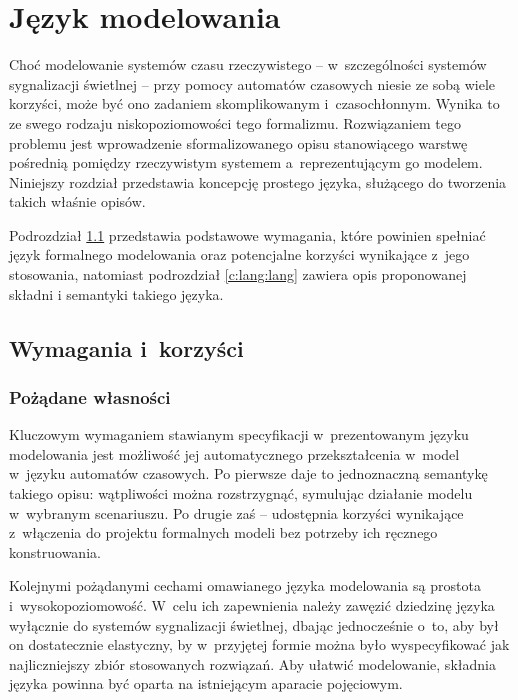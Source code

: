 \documentclass{pracamgr}
\newcommand{\upp}{\textsc{Uppaal}}
\theoremstyle{plain}
\begin{document}

\chapter{Język modelowania}
\label{c:lang}
Choć modelowanie systemów czasu rzeczywistego -- w~szczególności
systemów sygnalizacji świetlnej -- przy pomocy automatów czasowych
niesie ze sobą wiele korzyści, może być ono zadaniem skomplikowanym
i~czasochłonnym. Wynika to ze swego rodzaju niskopoziomowości tego
formalizmu. Rozwiązaniem tego problemu jest wprowadzenie
sformalizowanego opisu stanowiącego warstwę pośrednią pomiędzy
rzeczywistym systemem a~reprezentującym go modelem.  Niniejszy
rozdział przedstawia koncepcję prostego języka, służącego do tworzenia
takich właśnie opisów.

Podrozdział \ref{c:lang:req} przedstawia podstawowe wymagania, które
powinien spełniać język formalnego modelowania oraz potencjalne
korzyści wynikające z~jego stosowania, natomiast podrozdział
\ref{c:lang:lang} zawiera opis proponowanej składni i semantyki
takiego języka.

\section{Wymagania i~korzyści}
\label{c:lang:req}

\subsection{Pożądane własności}

Kluczowym wymaganiem stawianym specyfikacji w~prezentowanym języku
modelowania jest możliwość jej automatycznego przekształcenia w~model
w~języku automatów czasowych. Po pierwsze daje to jednoznaczną
semantykę takiego opisu: wątpliwości można rozstrzygnąć, symulując
działanie modelu w~wybranym scenariuszu. Po drugie zaś -- udostępnia
korzyści wynikające z~włączenia do projektu formalnych modeli bez
potrzeby ich ręcznego konstruowania.

Kolejnymi pożądanymi cechami omawianego języka modelowania są prostota
i~wysokopoziomowość. W~celu ich zapewnienia należy zawęzić dziedzinę
języka wyłącznie do systemów sygnalizacji świetlnej, dbając
jednocześnie o~to, aby był on dostatecznie elastyczny, by w~przyjętej
formie można było wyspecyfikować jak najliczniejszy zbiór stosowanych
rozwiązań. Aby ułatwić modelowanie, składnia języka powinna być oparta
na istniejącym aparacie pojęciowym.
\end{document}
